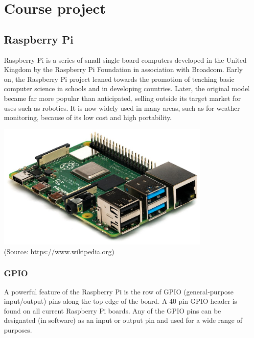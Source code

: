 \chapter{Course project}
\section{Raspberry Pi}
Raspberry Pi is a series of small single-board computers developed in the
United Kingdom by the Raspberry Pi Foundation in association with Broadcom.
Early on, the Raspberry Pi project leaned towards the promotion of teaching
basic computer science in schools and in developing countries.
Later, the original model became far more popular than anticipated,
selling outside its target market for uses such as robotics. It is now
widely used in many areas, such as for weather monitoring,
because of its low cost and high portability.

\begin{centering}
\includegraphics[width=300pt]{images/coursework/raspberrypi.jpeg}\\
(Source: https://www.wikipedia.org)
\end{centering}

\subsection{GPIO}
A powerful feature of the Raspberry Pi is the row of GPIO
(general-purpose input/output) pins along the top edge of the board.
A 40-pin GPIO header is found on all current Raspberry Pi boards.
Any of the GPIO pins can be designated (in software) as an input or output
pin and used for a wide range of purposes.

